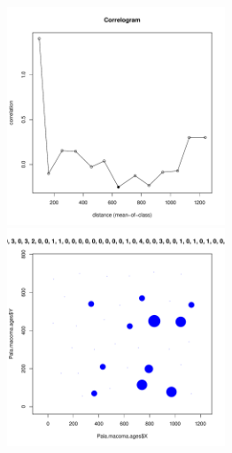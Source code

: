 \begin{figure}[h]
	\begin{minipage}[b]{.46\linewidth}
	\begin{center}
		\includegraphics[width=65mm]{../Barenc_Sea/distribution_Moran/Pala_macoma_age_N11_.pdf}
	\end{center}
	\end{minipage}
	\hfil %
	\begin{minipage}[b]{.46\linewidth}
	\begin{center}
		\includegraphics[width=65mm]{../Barenc_Sea/distribution_Moran/Pala_macoma_age_bubb_N11_.pdf}
	\end{center}
	\end{minipage}

	\end{figure}




